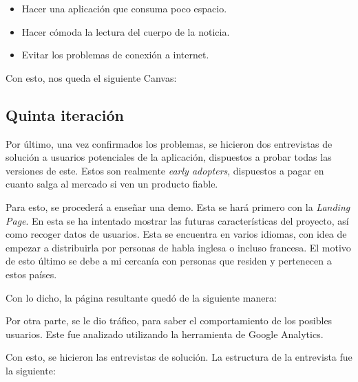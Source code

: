 \begin{itemize}
    \item Hacer una aplicación que consuma poco espacio.
    \item Hacer cómoda la lectura del cuerpo de la noticia.
    \item Evitar los problemas de conexión a internet.
\end{itemize}

Con esto, nos queda el siguiente Canvas:


\subsection{Quinta iteración}
Por último, una vez confirmados los problemas, se hicieron dos entrevistas de solución a usuarios potenciales de la aplicación, dispuestos a probar todas las versiones de este. Estos son realmente \textit{early adopters}, dispuestos a pagar en cuanto salga al mercado si ven un producto fiable.

Para esto, se procederá a enseñar una demo. Esta se hará primero con la \textit{Landing Page}. En esta se ha intentado mostrar las futuras características del proyecto, así como recoger datos de usuarios. Esta se encuentra en varios idiomas, con idea de empezar a distribuirla por personas de habla inglesa o incluso francesa. El motivo de esto último se debe a mi cercanía con personas que residen y pertenecen a estos países.

Con lo dicho, la página resultante quedó de la siguiente manera:


Por otra parte, se le dio tráfico, para saber el comportamiento de los posibles usuarios. Este fue analizado utilizando la herramienta de Google Analytics.


Con esto, se hicieron las entrevistas de solución. La estructura de la entrevista fue la siguiente:

